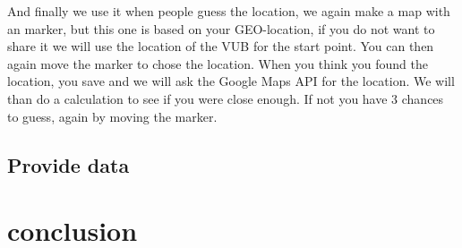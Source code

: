 \documentclass[11pt, oneside]{article}   	%
\begin{document}
And finally we use it when people guess the location, we again make a map with an marker, but this one is based on your GEO-location, if you do not want to share it we will use the location of the VUB for the start point. You can then again move the marker to chose the location. When you think you found the location, you save and we will ask the Google Maps API for the location. We will than do a calculation to see if you were close enough. If not you have 3 chances to guess, again by moving the marker. \\


\subsection{Provide data}

\section{conclusion}






 
\end{document}
